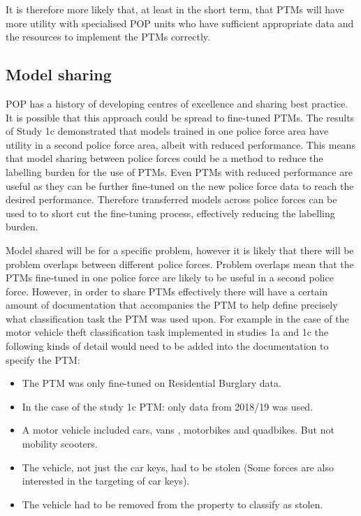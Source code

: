 It is therefore more likely that, at least in the short term, that PTMs will have more utility with specialised POP units who have sufficient appropriate data and the resources to implement the PTMs correctly.

\subsection{Model sharing} POP has a history of developing centres of excellence and sharing best practice. It is possible that this approach could be spread to fine-tuned PTMs. The results of Study 1c demonstrated that models trained in one police force area have utility in a second police force area, albeit with reduced performance. This means that model sharing between police forces could be a method to reduce the labelling burden for the use of PTMs. Even PTMs with reduced performance are useful as they can be further fine-tuned on the new police force data to reach the desired performance.  Therefore transferred models across police forces can be used to to short cut the fine-tuning process, effectively reducing the labelling burden. 

Model shared will be for a specific problem, however it is likely that there will be problem overlaps between different police forces. Problem overlaps mean that the PTMs fine-tuned in one police force are likely to be useful in a second police force. However, in order to share PTMs effectively there will have a certain amount of documentation that accompanies the PTM to help define precisely what classification task the PTM was used upon. For example in the case of the motor vehicle theft classification task implemented in studies 1a and 1c the following kinds of detail would need to be added into the documentation to specify the PTM:

\begin{itemize}

\item The PTM was only fine-tuned on Residential Burglary data.

\item In the case of the study 1c PTM: only data from 2018/19 was used.

\item A motor vehicle included cars, vans , motorbikes and quadbikes. But not mobility scooters.

\item The vehicle, not just the car keys, had to be stolen (Some forces are also interested in the targeting of car keys).

\item The vehicle had to be removed from the property to classify as stolen.

\end{itemize}

